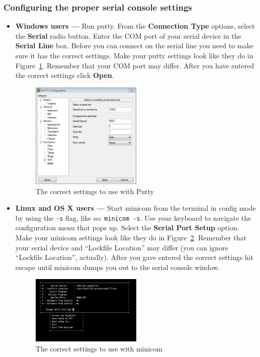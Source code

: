 \documentclass[notitlepage]{article}
\begin{document}
\subsubsection{Configuring the proper serial console settings}
\begin{itemize}
\item \textbf{Windows users --- }
  Run putty. From the \textbf{Connection Type} options, select the \textbf{Serial} radio button. Enter the COM port of your serial device in the \textbf{Serial Line} box. Before you can connect on the serial line you need to make sure it has the correct settings. Make your putty settings look like they do in Figure~\ref{fig:putty}. Remember that your COM port may differ. After you have entered the correct settings click \textbf{Open}.
\begin{figure}[ht!]
  \centering
  \includegraphics[width=0.5\textwidth]{fig0.png}
  \caption{The correct settings to use with Putty}
  \label{fig:putty}
\end{figure}
\item \textbf{Linux and OS X users --- } Start minicom from the terminal in config mode by using the \texttt{-s} flag, like so: \texttt{minicom -s}. Use your keyboard to navigate the configuration menu that pops up. Select the \textbf{Serial Port Setup} option. Make your minicom settings look like they do in Figure~\ref{fig:minicom}. Remember that your serial device and ``Lockfile Location'' may differ (you can ignore ``Lockfile Location'', actually). After you gave entered the correct settings hit escape until minicom dumps you out to the serial console window.
\begin{figure}[ht!]
  \centering
  \includegraphics[width=0.5\textwidth]{fig1.png}
  \caption{The correct settings to use with minicom}
  \label{fig:minicom}
\end{figure}
\end{itemize}
\end{document}
